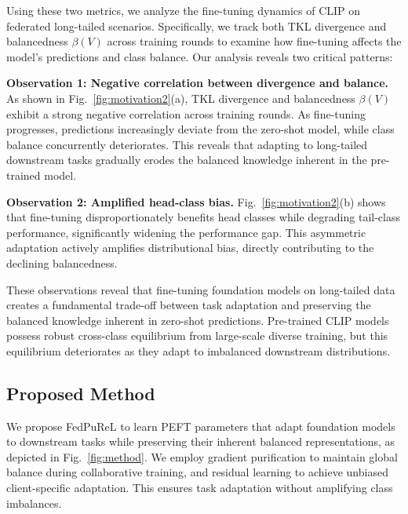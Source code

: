 \documentclass[10pt,twocolumn,letterpaper]{article}
\begin{document}
Using these two metrics, we analyze the fine-tuning dynamics of CLIP on federated long-tailed scenarios. Specifically, we track both TKL divergence and balancedness $\beta(V)$ across training rounds to examine how fine-tuning affects the model's predictions and class balance. Our analysis reveals two critical patterns:

\noindent\textbf{Observation 1: Negative correlation between divergence and balance.} As shown in Fig.~\ref{fig:motivation2}(a), TKL divergence and balancedness $\beta(V)$ exhibit a strong negative correlation across training rounds. As fine-tuning progresses, predictions increasingly deviate from the zero-shot model, while class balance concurrently deteriorates. This reveals that adapting to long-tailed downstream tasks gradually erodes the balanced knowledge inherent in the pre-trained model.


\noindent\textbf{Observation 2: Amplified head-class bias.}
Fig.~\ref{fig:motivation2}(b) shows that fine-tuning disproportionately benefits head classes while degrading tail-class performance, significantly widening the performance gap. This asymmetric adaptation actively amplifies distributional bias, directly contributing to the declining balancedness.

These observations reveal that fine-tuning foundation models on long-tailed data creates a fundamental trade-off between task adaptation and preserving the balanced knowledge inherent in zero-shot predictions. Pre-trained CLIP models possess robust cross-class equilibrium from large-scale diverse training, but this equilibrium deteriorates as they adapt to imbalanced downstream distributions.

\subsection{Proposed Method}


We propose FedPuReL to learn PEFT parameters that adapt foundation models to downstream tasks while preserving their inherent balanced representations, as depicted in Fig.~\ref{fig:method}. We employ gradient purification to maintain global balance during collaborative training, and residual learning to achieve unbiased client-specific adaptation. This ensures task adaptation without amplifying class imbalances.
\end{document}

